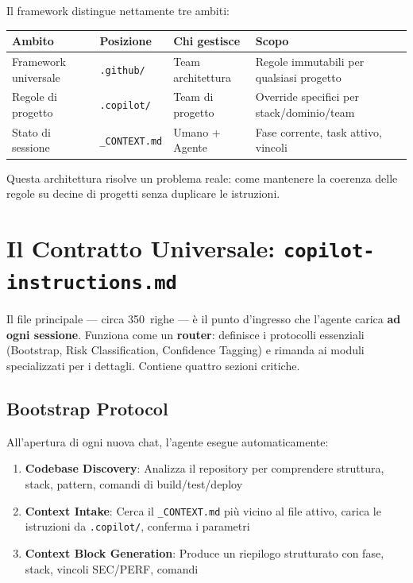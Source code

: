 Il framework distingue nettamente tre ambiti:

\begin{center}
\begin{small}
\begin{tabularx}{\textwidth}{l l l X}
\toprule
\textbf{Ambito} & \textbf{Posizione} & \textbf{Chi gestisce} & \textbf{Scopo} \\
\midrule
Framework universale & \texttt{.github/} & Team architettura & Regole immutabili per qualsiasi progetto \\
Regole di progetto & \texttt{.copilot/} & Team di progetto & Override specifici per stack/dominio/team \\
Stato di sessione & \texttt{\_CONTEXT.md} & Umano + Agente & Fase corrente, task attivo, vincoli \\
\bottomrule
\end{tabularx}
\end{small}
\end{center}

Questa architettura risolve un problema reale: come mantenere la coerenza delle regole su decine di progetti senza duplicare le istruzioni.

\section{Il Contratto Universale: \texttt{copilot-instructions.md}}

Il file principale --- circa 350~righe --- \`e il punto d'ingresso che l'agente carica \textbf{ad ogni sessione}. Funziona come un \textbf{router}: definisce i protocolli essenziali (Bootstrap, Risk Classification, Confidence Tagging) e rimanda ai moduli specializzati per i dettagli. Contiene quattro sezioni critiche.

\subsection{Bootstrap Protocol}

All'apertura di ogni nuova chat, l'agente esegue automaticamente:

\begin{enumerate}
  \item \textbf{Codebase Discovery}: Analizza il repository per comprendere struttura, stack, pattern, comandi di build/test/deploy
  \item \textbf{Context Intake}: Cerca il \texttt{\_CONTEXT.md} più vicino al file attivo, carica le istruzioni da \texttt{.copilot/}, conferma i parametri
  \item \textbf{Context Block Generation}: Produce un riepilogo strutturato con fase, stack, vincoli SEC/PERF, comandi
\end{enumerate}

